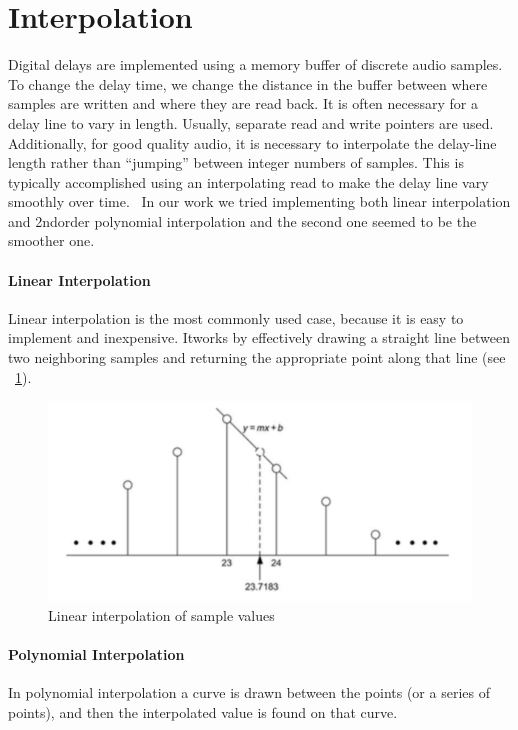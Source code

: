 \section{Interpolation}

Digital delays are implemented using a memory buffer of discrete audio samples. To change the delay time, we change the distance in the buffer between where samples are written and where they are read back.\cite{reiss2014audio}
It is often necessary for a delay line to vary in length. Usually, separate read and write pointers are used. Additionally, for good quality audio, it is necessary to interpolate the delay-line length rather than ``jumping'' between integer numbers of samples. This is typically accomplished using an interpolating read to make the delay line vary smoothly over time.~\cite{smith2010physical}
In our work we tried implementing both linear interpolation and 2ndorder polynomial interpolation and the second one seemed to be the smoother one.

\paragraph{Linear Interpolation}
Linear interpolation is the most commonly used case, because it is easy to implement and inexpensive.
Itworks by effectively drawing a straight line between two neighboring samples and returning the appropriate point along that line (see ~\ref{fig:linear-interpolation}).
  
\begin{figure}[h]
	\centering
  	\includegraphics[width=0.8\linewidth]{assets/Linear interpolation of sample values.png}
  	\caption{Linear interpolation of sample values}
  	\label{fig:linear-interpolation}
\end{figure}



\paragraph{Polynomial Interpolation}
In polynomial interpolation a curve is drawn between the points (or a series of points), and then the interpolated value is found on that curve.~\cite{pirkle2013designing}



